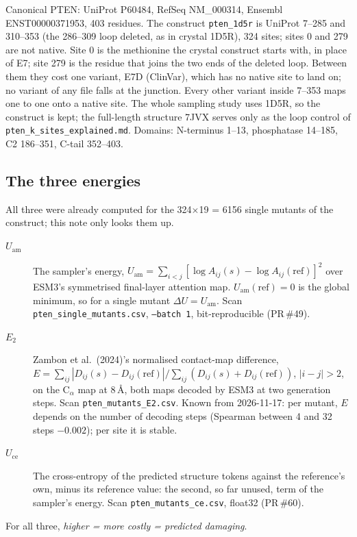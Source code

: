 \documentclass[11pt,a4paper]{article}
\newcommand{\file}[1]{\texttt{#1}}
\newcommand{\Uam}{U_{\mathrm{am}}}
\newcommand{\Uce}{U_{\mathrm{ce}}}
\newcommand{\Etwo}{E_{2}}
\begin{document}
Canonical PTEN: UniProt P60484, RefSeq NM\_000314, Ensembl ENST00000371953,
403 residues. The construct \file{pten\_1d5r} is UniProt 7--285 and 310--353
(the 286--309 loop deleted, as in crystal 1D5R), 324 sites; sites 0 and 279
are not native. Site 0 is the methionine the crystal construct starts with, in
place of E7; site 279 is the residue that joins the two ends of the deleted
loop. Between them they cost one variant, E7D (ClinVar), which has no native
site to land on; no variant of any file falls at the junction. Every other
variant inside 7--353 maps one to one onto a native site. The whole sampling
study uses 1D5R, so the construct is kept; the full-length structure 7JVX
serves only as the loop control of \file{pten\_k\_sites\_explained.md}. Domains: N-terminus 1--13, phosphatase 14--185, C2 186--351,
C-tail 352--403.

\subsection{The three energies}

All three were already computed for the 324$\times$19 = 6156 single mutants of
the construct; this note only looks them up.

\begin{description}
\item[$\Uam$] The sampler's energy,
  $\Uam = \sum_{i<j}\left[\log A_{ij}(s) - \log A_{ij}(\mathrm{ref})\right]^2$
  over ESM3's symmetrised final-layer attention map. $\Uam(\mathrm{ref})=0$ is
  the global minimum, so for a single mutant $\Delta U = \Uam$. Scan
  \file{pten\_single\_mutants.csv}, \texttt{--batch 1}, bit-reproducible
  (PR\,\#49).
\item[$\Etwo$] Zambon et al.\ (2024)'s normalised contact-map difference,
  $E = \sum_{ij}|D_{ij}(s)-D_{ij}(\mathrm{ref})| / \sum_{ij}(D_{ij}(s)+D_{ij}(\mathrm{ref}))$,
  $|i-j|>2$, on the C$_\alpha$ map at 8\,\AA, both maps decoded by ESM3 at two
  generation steps. Scan \file{pten\_mutants\_E2.csv}. Known from 2026-11-17:
  per mutant, $E$ depends on the number of decoding steps (Spearman between 4
  and 32 steps $-0.002$); per site it is stable.
\item[$\Uce$] The cross-entropy of the predicted structure tokens against
  the reference's own, minus its reference value: the second, so far unused,
  term of the sampler's energy. Scan \file{pten\_mutants\_ce.csv}, float32
  (PR\,\#60).
\end{description}
For all three, \emph{higher = more costly = predicted damaging}.
\end{document}
